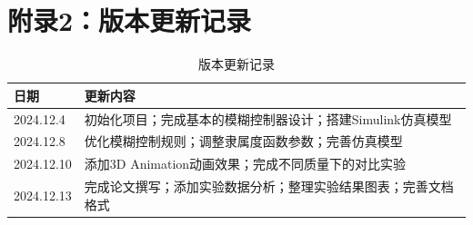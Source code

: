 \documentclass[12pt,a4paper,UTF8]{article}
\begin{document}
\newpage
\section{附录2：版本更新记录}

\begin{table}[htbp]
    \centering
    \begin{tabular}{|l|p{12cm}|}
        \hline
        日期 & 更新内容 \\
        \hline
        2024.12.4 & 初始化项目；完成基本的模糊控制器设计；搭建Simulink仿真模型 \\
        \hline
        2024.12.8 & 优化模糊控制规则；调整隶属度函数参数；完善仿真模型 \\
        \hline
        2024.12.10 & 添加3D Animation动画效果；完成不同质量下的对比实验 \\
        \hline
        2024.12.13 & 完成论文撰写；添加实验数据分析；整理实验结果图表；完善文档格式 \\
        \hline
    \end{tabular}
    \caption{版本更新记录}
\end{table}

\nocite{*}


\end{document}
